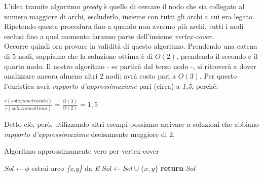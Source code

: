 L'idea tramite algoritmo \textit{greedy} è quello di cercare il nodo che sia collegato al numero maggiore di archi, escluderlo, insieme con tutti gli archi a cui era legato. Ripetendo questa procedura fino a quando non avremo più archi, tutti i nodi esclusi fino a quel momento faranno parte dell'insieme \textit{vertex-cover}. \\
Occorre quindi ora provare la validità di questo algoritmo.
Prendendo una catena di 5 nodi, sappiamo che la soluzione ottima è di $O(2)$, prendendo il secondo e il quarto nodo. Il nostro algoritmo - se partirà dal terzo nodo -, si ritroverà a dover analizzare ancora almeno altri 2 nodi: avrà costo pari a $O(3)$. Per questo l'euristica avrà \textit{rapporto d'approssimazione} pari (circa) a \textit{1,5}, perché:
\begin{center}
	$\frac{c(soluzione trovata)}{c(soluzione ottima)} = \frac{O(3)}{O(2)} = 1,5$
\end{center}
Detto ciò, però, utilizzando altri esempi possiamo arrivare a soluzioni che abbiano \textit{rapporto d'approssimazione} decisamente maggiore di 2. \\
\begin{algorithm}
	\caption{Algoritmo approssimamente vero per vertex-cover}\label{alg:VC1}
	\begin{algorithmic}[1]
		\State $Sol \gets \phi$  
		\State estrai arco \textit{\{x,y\}} da \textit{E}
		\State $Sol \gets Sol \cup \{x,y\}$
		\EndIf
		\EndWhile
		\State \textbf{return} \textit{Sol}
		\EndFunction
	\end{algorithmic}
\end{algorithm} \hfill \\

